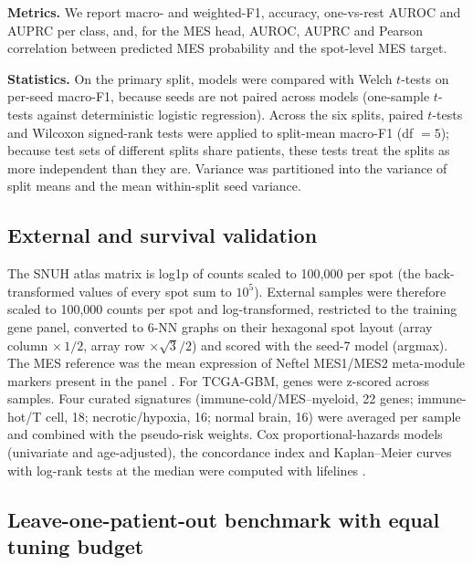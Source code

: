 \documentclass[11pt,letterpaper]{article}
\begin{document}
\textbf{Metrics.} We report macro- and weighted-F1, accuracy, one-vs-rest AUROC and AUPRC per class, and, for the MES head, AUROC, AUPRC and Pearson correlation between predicted MES probability and the spot-level MES target.

\textbf{Statistics.} On the primary split, models were compared with Welch $t$-tests on per-seed macro-F1, because seeds are not paired across models (one-sample $t$-tests against deterministic logistic regression). Across the six splits, paired $t$-tests and Wilcoxon signed-rank tests were applied to split-mean macro-F1 (df $= 5$); because test sets of different splits share patients, these tests treat the splits as more independent than they are. Variance was partitioned into the variance of split means and the mean within-split seed variance.

\subsection{External and survival validation}

The SNUH atlas matrix is log1p of counts scaled to 100{,}000 per spot (the back-transformed values of every spot sum to $10^5$). External samples were therefore scaled to 100{,}000 counts per spot and log-transformed, restricted to the training gene panel, converted to 6-NN graphs on their hexagonal spot layout (array column $\times\,1/2$, array row $\times \sqrt{3}/2$) and scored with the seed-7 model (argmax). The MES reference was the mean expression of Neftel MES1/MES2 meta-module markers present in the panel \cite{neftel2019}. For TCGA-GBM, genes were z-scored across samples. Four curated signatures (immune-cold/MES--myeloid, 22 genes; immune-hot/T cell, 18; necrotic/hypoxia, 16; normal brain, 16) were averaged per sample and combined with the pseudo-risk weights. Cox proportional-hazards models (univariate and age-adjusted), the concordance index and Kaplan--Meier curves with log-rank tests at the median were computed with lifelines \cite{davidsonpilon2019}.

\subsection{Leave-one-patient-out benchmark with equal tuning budget}
\end{document}
